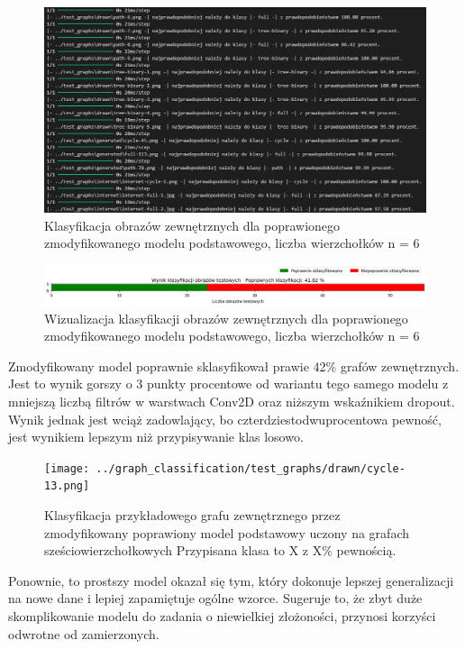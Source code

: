 \begin{figure}[ht]
	\centering
	\includegraphics[width=14cm]{resources/tests/images/v4/base6_1_1_txt.png}
	\caption{Klasyfikacja obrazów zewnętrznych dla poprawionego zmodyfikowanego modelu podstawowego, liczba wierzchołków n = 6}
	\label{Fig:tests-best-2b}
\end{figure}
\FloatBarrier

\begin{figure}[ht]
	\centering
	\includegraphics[width=14cm]{resources/tests/images/v4/base6_1_1_bar.png}
	\caption{Wizualizacja klasyfikacji obrazów zewnętrznych dla poprawionego zmodyfikowanego modelu podstawowego, liczba wierzchołków n = 6}
	\label{Fig:tests-best-1c}
\end{figure}
\FloatBarrier

Zmodyfikowany model poprawnie sklasyfikował prawie 42\% grafów zewnętrznych.
Jest to wynik gorszy o 3 punkty procentowe od wariantu tego samego modelu
z mniejszą liczbą filtrów w warstwach Conv2D oraz niższym wskaźnikiem dropout.
Wynik jednak jest wciąż zadowlający, bo czterdziestodwuprocentowa pewność,
jest wynikiem lepszym niż przypisywanie klas losowo.

\begin{figure}[ht]
	\centering
	\texttt{[image: ../graph\_classification/test\_graphs/drawn/cycle-13.png]}
	\caption{Klasyfikacja przykładowego grafu zewnętrznego przez zmodyfikowany poprawiony model podstawowy
		uczony na grafach sześciowierzchołkowych
		Przypisana klasa to X z X\% pewnością.}
	\label{Fig:tests-best-1d}
\end{figure}
\FloatBarrier

Ponownie, to prostszy model okazał się tym, który dokonuje lepszej generalizacji na nowe dane
i lepiej zapamiętuje ogólne wzorce.
Sugeruje to, że zbyt duże skomplikowanie modelu do zadania o niewielkiej złożoności,
przynosi korzyści odwrotne od zamierzonych.